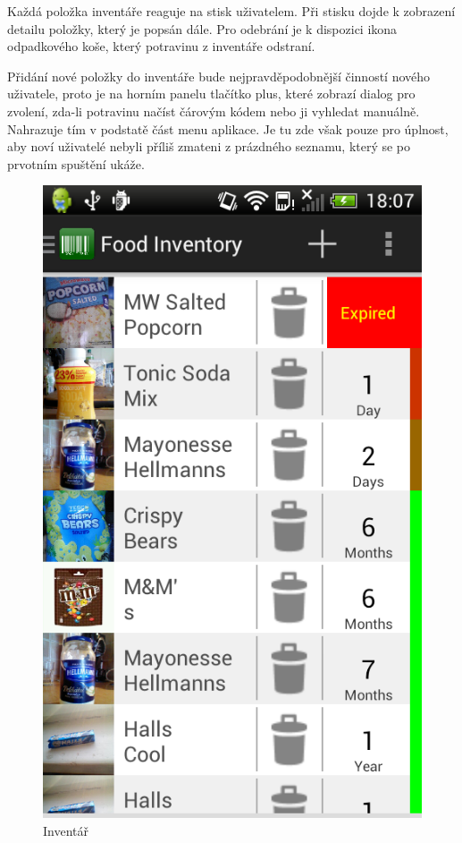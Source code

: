 \documentclass[thesis=B,czech]{FITthesis}[2013/10/20]
\begin{document}
Každá položka inventáře reaguje na stisk uživatelem. Při stisku dojde k zobrazení detailu položky, který je popsán dále. Pro odebrání je k dispozici ikona odpadkového koše, který potravinu z inventáře odstraní.

Přidání nové položky do inventáře bude nejpravděpodobnější činností nového uživatele, proto je na horním panelu tlačítko plus, které zobrazí dialog pro zvolení, zda-li potravinu načíst čárovým kódem nebo ji vyhledat manuálně. Nahrazuje tím v podstatě část menu aplikace. Je tu zde však pouze pro úplnost, aby noví uživatelé nebyli příliš zmateni z prázdného seznamu, který se po prvotním spuštění ukáže.

\begin{figure}[H]
  \centering
  \includegraphics[scale=0.4]{screenshots/app_inventory.png}
  \caption{Inventář}
  \label{fig:AppInventory}
\end{figure}
\end{document}
